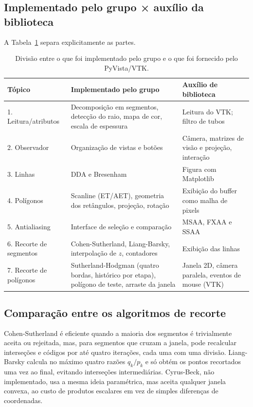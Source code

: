 \subsection{Implementado pelo grupo × auxílio da biblioteca}
A Tabela~\ref{tab:atribuicao} separa explicitamente as partes.

\begin{table}[htbp]
  \centering\small
  \caption{Divisão entre o que foi implementado pelo grupo e o que foi fornecido pelo PyVista/VTK.}
  \label{tab:atribuicao}
  \begin{tabularx}{\textwidth}{l X X}
    \toprule
    \textbf{Tópico} & \textbf{Implementado pelo grupo} & \textbf{Auxílio de biblioteca}\\
    \midrule
    1. Leitura/atributos & Decomposição em segmentos, detecção do raio, mapa de cor, escala de espessura & Leitura do VTK; filtro de tubos\\
    2. Observador & Organização de vistas e botões & Câmera, matrizes de visão e projeção, interação\\
    3. Linhas & DDA e Bresenham & Figura com Matplotlib\\
    4. Polígonos & Scanline (ET/AET), geometria dos retângulos, projeção, rotação & Exibição do buffer como malha de pixels\\
    5. Antialiasing & Interface de seleção e comparação & MSAA, FXAA e SSAA\\
    6. Recorte de segmentos & Cohen-Sutherland, Liang-Barsky, interpolação de $z$, contadores & Exibição das linhas\\
    7. Recorte de polígonos & Sutherland-Hodgman (quatro bordas, histórico por etapa), polígono de teste, arraste da janela & Janela 2D, câmera paralela, eventos de mouse (VTK)\\
    \bottomrule
  \end{tabularx}
\end{table}

\subsection{Comparação entre os algoritmos de recorte}
Cohen-Sutherland é eficiente quando a maioria dos segmentos é trivialmente aceita ou rejeitada, mas, para segmentos que cruzam a janela, pode recalcular interseções e códigos por até quatro iterações, cada uma com uma divisão. Liang-Barsky calcula no máximo quatro razões $q_k/p_k$ e só obtém os pontos recortados uma vez ao final, evitando interseções intermediárias. Cyrus-Beck, não implementado, usa a mesma ideia paramétrica, mas aceita qualquer janela convexa, ao custo de produtos escalares em vez de simples diferenças de coordenadas.

